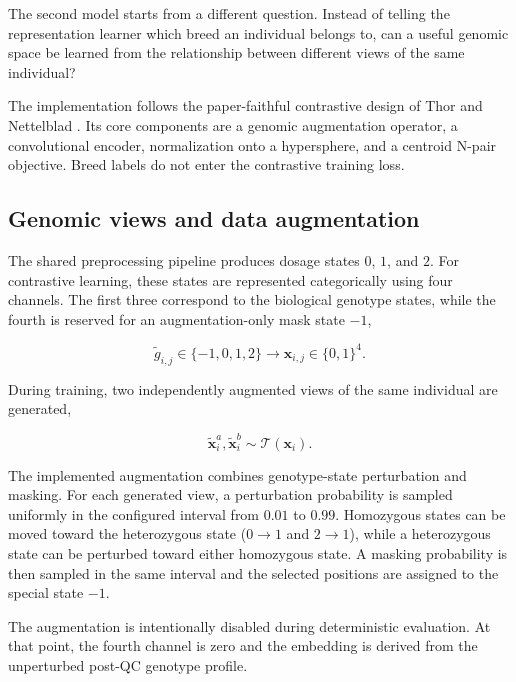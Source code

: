 The second model starts from a different question. Instead of telling
the representation learner which breed an individual belongs to, can
a useful genomic space be learned from the relationship between
different views of the same individual?

The implementation follows the paper-faithful contrastive design of
Thor and Nettelblad \cite{thor2025contrastive}. Its core components are
a genomic augmentation operator, a convolutional encoder, normalization
onto a hypersphere, and a centroid N-pair objective. Breed labels do not
enter the contrastive training loss.

\subsection{Genomic views and data augmentation}

The shared preprocessing pipeline produces dosage states $0$, $1$,
and $2$. For contrastive learning, these states are represented
categorically using four channels. The first three correspond to the
biological genotype states, while the fourth is reserved for an
augmentation-only mask state $-1$,

\begin{equation}
    \tilde{g}_{i,j}
    \in
    \{-1,0,1,2\}
    \longrightarrow
    \mathbf{x}_{i,j}
    \in
    \{0,1\}^{4}.
    \label{eq:contrastive_one_hot}
\end{equation}

During training, two independently augmented views of the same
individual are generated,

\begin{equation}
    \tilde{\mathbf{x}}_i^{a},
    \tilde{\mathbf{x}}_i^{b}
    \sim
    \mathcal{T}(\mathbf{x}_i).
    \label{eq:contrastive_views}
\end{equation}

The implemented augmentation combines genotype-state perturbation and
masking. For each generated view, a perturbation probability is
sampled uniformly in the configured interval from $0.01$ to $0.99$.
Homozygous states can be moved toward the heterozygous state
($0\rightarrow1$ and $2\rightarrow1$), while a heterozygous state can
be perturbed toward either homozygous state. A masking probability is
then sampled in the same interval and the selected positions are
assigned to the special state $-1$.

The augmentation is intentionally disabled during deterministic
evaluation. At that point, the fourth channel is zero and the embedding
is derived from the unperturbed post-QC genotype profile.

